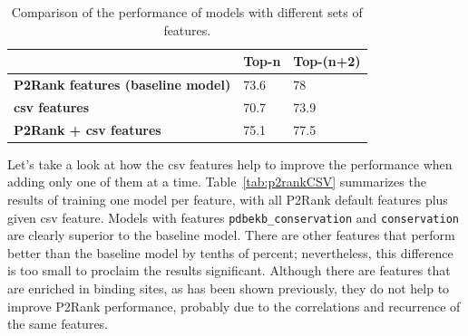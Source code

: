 \begin{table}[]
\centering
\begin{tabular}{lll}
\hline
\textbf{}                                 & Top-n & Top-(n+2) \\ \hline
\textbf{P2Rank features (baseline model)} & 73.6  & 78        \\
\textbf{csv features}                     & 70.7  & 73.9      \\
\textbf{P2Rank + csv features}            & 75.1  & 77.5      \\ \hline
\end{tabular}
\caption{Comparison of the performance of models with different sets of features.}
\label{tab:p2rankbaseline}
\end{table}

Let's take a look at how the csv features help to improve the performance when adding only one of them at a time. Table~\ref{tab:p2rankCSV} summarizes the results of training one model per feature, with all P2Rank default features plus given csv feature. Models with features \texttt{pdbekb\_conservation} and \texttt{conservation} are clearly superior to the baseline model.  There are other features that perform better than the baseline model by tenths of percent; nevertheless, this difference is too small to proclaim the results significant. Although there are features that are enriched in binding sites, as has been shown previously, they do not help to improve P2Rank performance, probably due to the correlations and recurrence of the same features.

